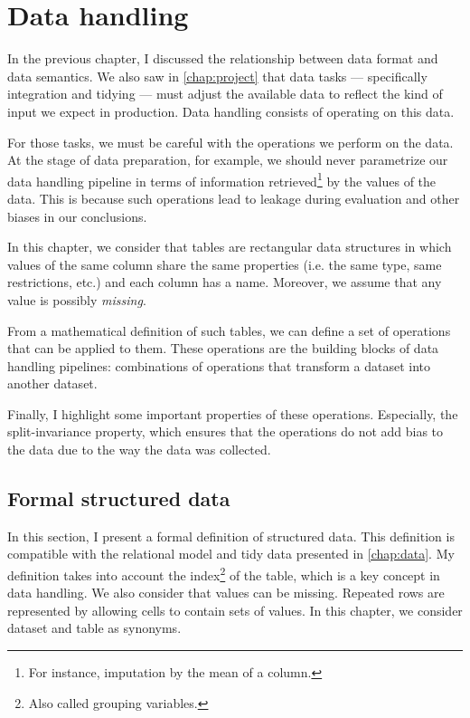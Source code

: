 \chapter{Data handling}
\label{chap:handling}

In the previous chapter, I discussed the relationship between data format and data
semantics.  We also saw in \cref{chap:project} that data tasks --- specifically
integration and tidying --- must adjust the available data to reflect the kind of
input we expect in production.  Data handling consists of operating on this data.

For those tasks, we must be careful with the operations we perform on the data. At the
stage of data preparation, for example, we should never parametrize our data handling
pipeline in terms of information retrieved\footnote{For instance, imputation by the mean
of a column.} by the values of the data.  This is because such operations lead to \gls{leakage}
during evaluation and other biases in our conclusions.

In this chapter, we consider that tables are rectangular data structures in which values
of the same column share the same properties (i.e. the same type, same restrictions, etc.)
and each column has a name.  Moreover, we assume that any value is possibly
\emph{missing}.

From a mathematical definition of such tables, we can define a set of operations that can
be applied to them.  These operations are the building blocks of data handling pipelines:
combinations of operations that transform a dataset into another dataset.

Finally, I highlight some important properties of these operations.  Especially, the
split-invariance property, which ensures that the operations do not add bias to the data
due to the way the data was collected.

\section{Formal structured data}
\label{sec:formal-structured-data}

\newcommand{\domainof}[1]{\mathcal{D}\!\left(#1\right)}
\newcommand{\missing}{\text{?}}
\newcommand{\rowcard}[1][k_1, \dots, k_k]{\operatorname{card}\!\left(#1\right)}

In this section, I present a formal definition of structured data.  This definition is
compatible with the relational model and tidy data presented in \cref{chap:data}.
My definition takes into account the index\footnote{Also called grouping variables.} of
the table, which is a key concept in data handling.  We also consider that values can be
missing.  Repeated rows are represented by allowing cells to contain sets of values.
In this chapter, we consider dataset and table as synonyms.

